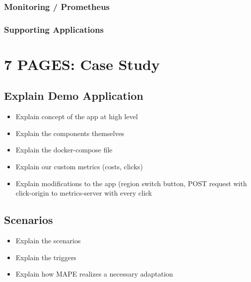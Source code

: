 \documentclass{seal_thesis}
\begin{document}
\subsection{Monitoring / Prometheus}

\subsection{Supporting Applications}



\chapter{7 PAGES: Case Study}

\section{Explain Demo Application}
\begin{itemize}
	\item Explain concept of the app at high level
	\item Explain the components themselves
	\item Explain the docker-compose file
	\item Explain our custom metrics (costs, clicks)
	\item Explain modifications to the app (region switch button, POST request with click-origin to metrics-server with every click
\end{itemize}

\section{Scenarios}
\begin{itemize}
	\item Explain the scenarios
	\item Explain the triggers
	\item Explain how MAPE realizes a necessary adaptation
\end{itemize}


\end{document}
